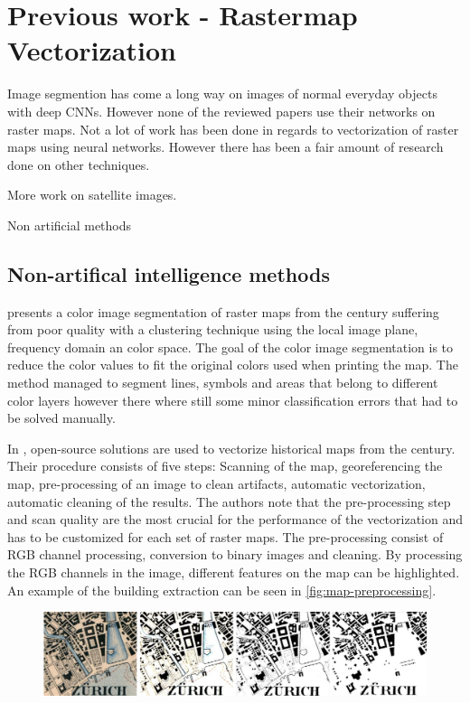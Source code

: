 \chapter{Previous work - Rastermap Vectorization}
Image segmention has come a long way on images of normal everyday objects with deep CNNs. However none of the reviewed papers use their networks on raster maps. Not a lot of work has been done in regards to vectorization of raster maps using neural networks. However there has been a fair amount of research done on other techniques.

More work on satellite images.

Non artificial methods 

\section{Non-artifical intelligence methods}

\citeauthor{Leyk2010} presents a color image segmentation of raster maps from the  century suffering from poor quality with a clustering technique using the local image plane, frequency domain an color space. The goal of the color image segmentation is to reduce the color values to fit the original colors used when printing the map. The method managed to segment lines, symbols and areas that belong to different color layers however there where still some minor classification errors that had to be solved manually.

In \cite{Iosifescu2016}, open-source solutions are used to vectorize historical maps from the  century. Their procedure consists of five steps: Scanning of the map, georeferencing the map, pre-processing of an image to clean artifacts, automatic vectorization, automatic cleaning of the results. The authors note that the pre-processing step and scan quality are the most crucial for the performance of the vectorization and has to be customized for each set of raster maps. The pre-processing consist of RGB channel processing, conversion to binary images and cleaning. By processing the RGB channels in the image, different features on the map can be highlighted. An example of the building extraction can be seen in \autoref{fig:map-preprocessing}. 

\begin{figure}[H]
	\centering
	\includegraphics[width=\linewidth]{fig/map-processing.png}
	\label{fig:map-preprocessing}
\end{figure}

